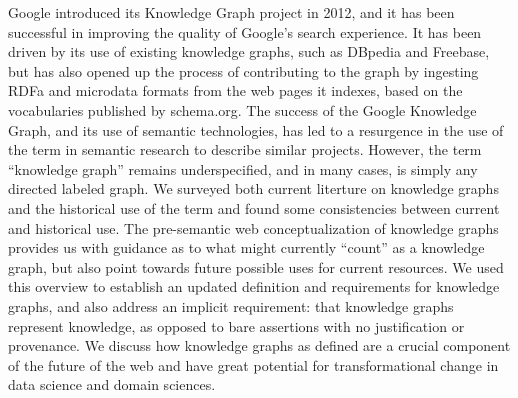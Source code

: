 Google introduced its Knowledge Graph project in 2012, and it has been successful in improving the quality of Google's search experience.
It has been driven by its use of existing knowledge graphs, such as DBpedia and Freebase, but has also opened up the process of contributing to the graph by ingesting RDFa and microdata formats from the web pages it indexes, based on the vocabularies published by schema.org.
The success of the Google Knowledge Graph, and its use of semantic technologies, has led to a resurgence in the use of the term in semantic research to describe similar projects.
However, the term ``knowledge graph'' remains underspecified, and in many cases, is simply any directed labeled graph.
We surveyed both current literture on knowledge graphs and the historical use of the term and found some consistencies between current and historical use.
The pre-semantic web conceptualization of knowledge graphs provides us with guidance as to what might currently ``count'' as a knowledge graph, but also point towards future possible uses for current resources.
We used this overview to establish an updated definition and requirements for knowledge graphs, and also address an implicit requirement: that knowledge graphs represent knowledge, as opposed to bare assertions with no justification or provenance.
We discuss how knowledge graphs as defined are a crucial component of the future of the web and have great potential for transformational change in data science and domain sciences.
